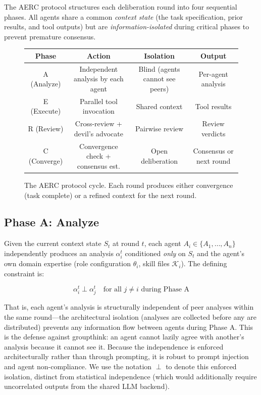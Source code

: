 \documentclass[11pt,a4paper]{article}
\begin{document}
The AERC protocol structures each deliberation round into four sequential phases. All agents share a common \emph{context state} (the task specification, prior results, and tool outputs) but are \emph{information-isolated} during critical phases to prevent premature consensus.

\begin{figure}[htbp]
\centering
\begin{tabular}{c|c|c|c}
\toprule
\textbf{Phase} & \textbf{Action} & \textbf{Isolation} & \textbf{Output} \\
\midrule
A (Analyze)  & Independent analysis by each agent & Blind (agents cannot see peers) & Per-agent analysis \\
E (Execute)  & Parallel tool invocation & Shared context & Tool results \\
R (Review)   & Cross-review + devil's advocate & Pairwise review & Review verdicts \\
C (Converge) & Convergence check + consensus est. & Open deliberation & Consensus or next round \\
\bottomrule
\end{tabular}
\caption{The AERC protocol cycle. Each round produces either convergence (task complete) or a refined context for the next round.}
\label{tab:aerc}
\end{figure}

\subsection{Phase A: Analyze}

Given the current context state $S_t$ at round $t$, each agent $A_i \in \{A_1, \ldots, A_n\}$ independently produces an analysis $\alpha_i^t$ conditioned \emph{only} on $S_t$ and the agent's own domain expertise (role configuration $\theta_i$, skill files $\mathcal{K}_i$). The defining constraint is:

\begin{equation}
\alpha_i^t \perp \alpha_j^t \quad \text{for all } j \neq i \text{ during Phase A}
\end{equation}

That is, each agent's analysis is structurally independent of peer analyses within the same round---the architectural isolation (analyses are collected before any are distributed) prevents any information flow between agents during Phase A. This is the defense against groupthink: an agent cannot lazily agree with another's analysis because it cannot see it. Because the independence is enforced architecturally rather than through prompting, it is robust to prompt injection and agent non-compliance. We use the notation $\perp$ to denote this enforced isolation, distinct from statistical independence (which would additionally require uncorrelated outputs from the shared LLM backend).
\end{document}
